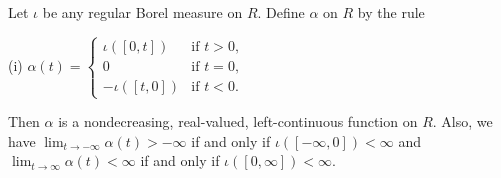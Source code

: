Let $\iota$ be any regular Borel measure on $R$. Define $\alpha$ on $R$ by the rule

(i) $\alpha(t) = \begin{cases} \iota([0, t]) & \text{if } t > 0, \\ 0 & \text{if } t = 0, \\ -\iota([t, 0]) & \text{if } t < 0. \end{cases}$

Then $\alpha$ is a nondecreasing, real-valued, left-continuous function on $R$. Also, we have $\lim_{t \to -\infty} \alpha(t) > -\infty$ if and only if $\iota([- \infty, 0]) < \infty$ and $\lim_{t \to \infty} \alpha(t) < \infty$ if and only if $\iota([0, \infty]) < \infty$.